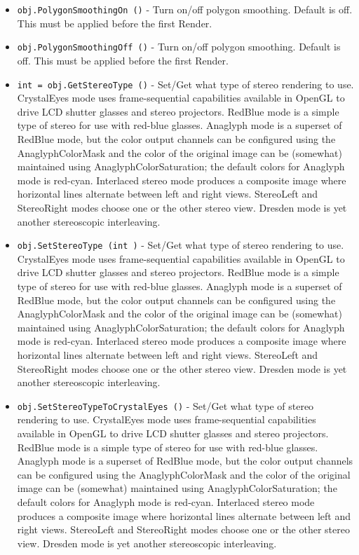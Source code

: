 \begin{itemize}
\item  \verb|obj.PolygonSmoothingOn ()| -  Turn on/off polygon smoothing. Default is off.
 This must be applied before the first Render.

\item  \verb|obj.PolygonSmoothingOff ()| -  Turn on/off polygon smoothing. Default is off.
 This must be applied before the first Render.

\item  \verb|int = obj.GetStereoType ()| -  Set/Get what type of stereo rendering to use.  CrystalEyes
 mode uses frame-sequential capabilities available in OpenGL
 to drive LCD shutter glasses and stereo projectors.  RedBlue
 mode is a simple type of stereo for use with red-blue glasses.
 Anaglyph mode is a superset of RedBlue mode, but the color
 output channels can be configured using the AnaglyphColorMask
 and the color of the original image can be (somewhat) maintained
 using AnaglyphColorSaturation;  the default colors for Anaglyph
 mode is red-cyan.  Interlaced stereo mode produces a composite
 image where horizontal lines alternate between left and right
 views.  StereoLeft and StereoRight modes choose one or the other
 stereo view.  Dresden mode is yet another stereoscopic
 interleaving.

\item  \verb|obj.SetStereoType (int )| -  Set/Get what type of stereo rendering to use.  CrystalEyes
 mode uses frame-sequential capabilities available in OpenGL
 to drive LCD shutter glasses and stereo projectors.  RedBlue
 mode is a simple type of stereo for use with red-blue glasses.
 Anaglyph mode is a superset of RedBlue mode, but the color
 output channels can be configured using the AnaglyphColorMask
 and the color of the original image can be (somewhat) maintained
 using AnaglyphColorSaturation;  the default colors for Anaglyph
 mode is red-cyan.  Interlaced stereo mode produces a composite
 image where horizontal lines alternate between left and right
 views.  StereoLeft and StereoRight modes choose one or the other
 stereo view.  Dresden mode is yet another stereoscopic
 interleaving.

\item  \verb|obj.SetStereoTypeToCrystalEyes ()| -  Set/Get what type of stereo rendering to use.  CrystalEyes
 mode uses frame-sequential capabilities available in OpenGL
 to drive LCD shutter glasses and stereo projectors.  RedBlue
 mode is a simple type of stereo for use with red-blue glasses.
 Anaglyph mode is a superset of RedBlue mode, but the color
 output channels can be configured using the AnaglyphColorMask
 and the color of the original image can be (somewhat) maintained
 using AnaglyphColorSaturation;  the default colors for Anaglyph
 mode is red-cyan.  Interlaced stereo mode produces a composite
 image where horizontal lines alternate between left and right
 views.  StereoLeft and StereoRight modes choose one or the other
 stereo view.  Dresden mode is yet another stereoscopic
 interleaving.


\end{itemize}
